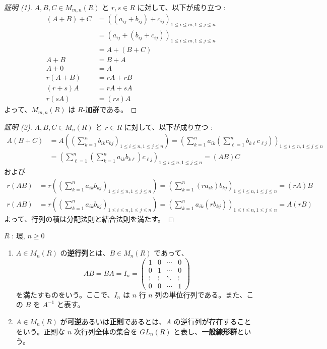 \documentclass[article,paper=a4paper]{jlreq}
\begin{document}
\begin{proof}[証明 (1)]
  $A, B, C \in M_{m, n}(R)$ と $r, s \in R$ に対して、以下が成り立つ :
  \begin{align*}
    (A+B)+C &= ((a_{ij} + b_{ij}) + c_{ij})_{1 \leq i \leq m, 1 \leq j \leq n} \\
    &= (a_{ij} + (b_{ij} + c_{ij}))_{1 \leq i \leq m, 1 \leq j \leq n} \\
    &= A+(B+C)\\
    A+B &= B+A\\
    A+0 &= A\\
    r(A+B) &= rA + rB\\
    (r+s)A &= rA + sA\\
    r(sA) &= (rs)A
  \end{align*}
  よって、$M_{m, n}(R)$ は $R$-加群である。
\end{proof}
\begin{proof}[証明 (2)]
  $A, B, C \in M_n(R)$ と $r \in R$ に対して、以下が成り立つ :
  \begin{align*}
    A(B+C) &= A\left(\left(\sum_{k=1}^n b_{ik}c_{kj}\right)_{1 \leq i \leq n, 1 \leq j \leq n}\right) = \left(\sum_{k=1}^n a_{ik}\left(\sum_{\ell=1}^n b_{k\ell}c_{\ell j}\right)\right)_{1 \leq i \leq n, 1 \leq j \leq n}\\
    &=\left(\sum_{\ell=1}^n\left(\sum_{k=1}^n a_{ik}b_{k\ell}\right)c_{\ell j}\right)_{1 \leq i \leq n, 1 \leq j \leq n} = (AB)C
  \end{align*}
  および
  \begin{align*}
    r(AB) &= r\left(\left(\sum_{k=1}^n a_{ik}b_{kj}\right)_{1 \leq i \leq n, 1 \leq j \leq n}\right) = \left(\sum_{k=1}^n (ra_{ik})b_{kj}\right)_{1 \leq i \leq n, 1 \leq j \leq n} = (rA)B\\
    r(AB) &= r\left(\left(\sum_{k=1}^n a_{ik}b_{kj}\right)_{1 \leq i \leq n, 1 \leq j \leq n}\right) = \left(\sum_{k=1}^n a_{ik}(rb_{kj})\right)_{1 \leq i \leq n, 1 \leq j \leq n} = A(rB)
  \end{align*}
  よって、行列の積は分配法則と結合法則を満たす。
\end{proof}

\begin{dfn}
  \quad $R$ : 環, $n \geq 0$
  \begin{enumerate}[label=(\arabic*)\,]
    \item $A \in M_n(R)$ の\textbf{逆行列}とは、$B \in M_n(R)$ であって、
    \[AB = BA = I_n = \begin{pmatrix}
1 & 0 & \cdots & 0 \\
0 & 1 & \cdots & 0 \\
\vdots & \vdots & \ddots & \vdots \\
0 & 0 & \cdots & 1  
    \end{pmatrix}\]
    を満たすものをいう。ここで、$I_n$ は $n$ 行 $n$ 列の単位行列である。また、この $B$ を $A^{-1}$ と表す。
      \item $A \in M_n(R)$ が\textbf{可逆}あるいは\textbf{正則}であるとは、$A$ の逆行列が存在することをいう。正則な $n$ 次行列全体の集合を $GL_n(R)$ と表し、\textbf{一般線形群}という。
  \end{enumerate}
\end{dfn}
\end{document}
